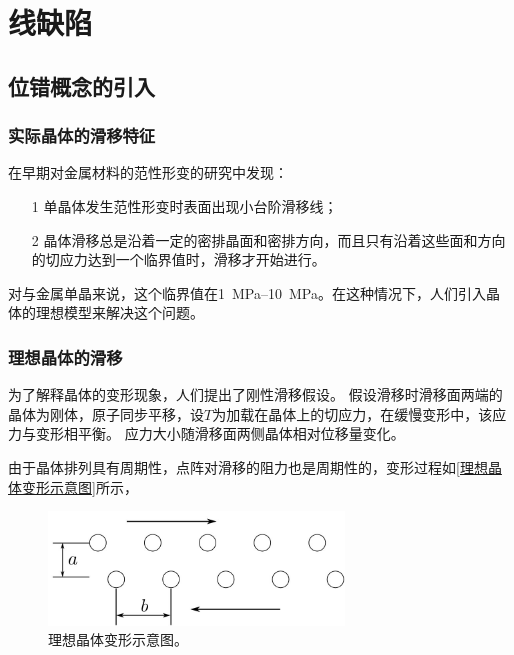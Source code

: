 \chapter{线缺陷}
    \section{位错概念的引入}
        \subsection{实际晶体的滑移特征}
            在早期对金属材料的范性形变的研究中发现：
            \begin{itemize}
                \item[1] 单晶体发生范性形变时表面出现小台阶滑移线；
                \item[2] 晶体滑移总是沿着一定的密排晶面和密排方向，而且只有沿着这些面和方向的切应力达到一个临界值时，滑移才开始进行。
            \end{itemize}
            对与金属单晶来说，这个临界值在\SIrange{1}{10}{\MPa}。在这种情况下，人们引入晶体的理想模型来解决这个问题。

        \subsection{理想晶体的滑移}
            为了解释晶体的变形现象，人们提出了刚性滑移假设。
            假设滑移时滑移面两端的晶体为刚体，原子同步平移，设$T$为加载在晶体上的切应力，在缓慢变形中，该应力与变形相平衡。
            应力大小随滑移面两侧晶体相对位移量变化。

            由于晶体排列具有周期性，点阵对滑移的阻力也是周期性的，变形过程如\autoref{理想晶体变形示意图}所示，
            \begin{figure}[ht]
                \centering
                \includegraphics[width=0.7\textwidth]{fig/deformation_of_ideal_crystal.jpg}
                \caption{理想晶体变形示意图。}
                \label{理想晶体变形示意图}
            \end{figure}
            
